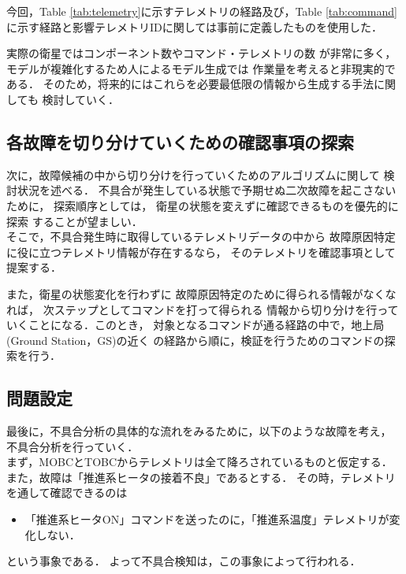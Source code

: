 \documentclass[11pt]{article}
\begin{document}
今回，Table \ref{tab:telemetry}に示すテレメトリの経路及び，Table \ref{tab:command}
に示す経路と影響テレメトリIDに関しては事前に定義したものを使用した．


実際の衛星ではコンポーネント数やコマンド・テレメトリの数
が非常に多く，モデルが複雑化するため人によるモデル生成では
作業量を考えると非現実的である．%
そのため，将来的にはこれらを必要最低限の情報から生成する手法に関しても
検討していく．

\subsection{各故障を切り分けていくための確認事項の探索}
次に，故障候補の中から切り分けを行っていくためのアルゴリズムに関して
検討状況を述べる．
不具合が発生している状態で予期せぬ二次故障を起こさないために，
探索順序としては，
衛星の状態を変えずに確認できるものを優先的に探索
することが望ましい．\\ %
そこで，不具合発生時に取得しているテレメトリデータの中から
故障原因特定に役に立つテレメトリ情報が存在するなら，
そのテレメトリを確認事項として提案する．

また，衛星の状態変化を行わずに
故障原因特定のために得られる情報がなくなれば，
次ステップとしてコマンドを打って得られる
情報から切り分けを行っていくことになる．このとき，
対象となるコマンドが通る経路の中で，地上局(Ground Station，GS)の近く
の経路から順に，検証を行うためのコマンドの探索を行う．

\subsection{問題設定}
最後に，不具合分析の具体的な流れをみるために，以下のような故障を考え，
不具合分析を行っていく．\\
まず，MOBCとTOBCからテレメトリは全て降ろされているものと仮定する．
また，故障は「推進系ヒータの接着不良」であるとする．
その時，テレメトリを通して確認できるのは
\begin{itemize}
   \item 「推進系ヒータON」コマンドを送ったのに，「推進系温度」テレメトリが変化しない．
\end{itemize}
という事象である．
よって不具合検知は，この事象によって行われる．
\end{document}
